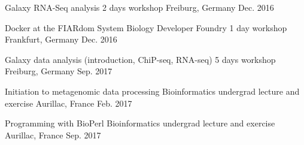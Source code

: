 
\begin{cvhonors}

  \cvhonor
    {Galaxy RNA-Seq analysis} %
    {2 days workshop} %
    {Freiburg, Germany} %
    {Dec. 2016} %

  \cvhonor
    {Docker at the FIARdom System Biology Developer Foundry} %
    {1 day workshop} %
    {Frankfurt, Germany} %
    {Dec. 2016} %

  \cvhonor
    {Galaxy data analysis (introduction, ChiP-seq, RNA-seq)} %
    {5 days workshop} %
    {Freiburg, Germany} %
    {Sep. 2017} %

  \cvhonor
    {Initiation to metagenomic data processing } %
    {Bioinformatics undergrad lecture and exercise} %
    {Aurillac, France} %
    {Feb. 2017} %

  \cvhonor
    {Programming with BioPerl} %
    {Bioinformatics undergrad lecture and exercise} %
    {Aurillac, France} %
    {Sep. 2017} %

\end{cvhonors}